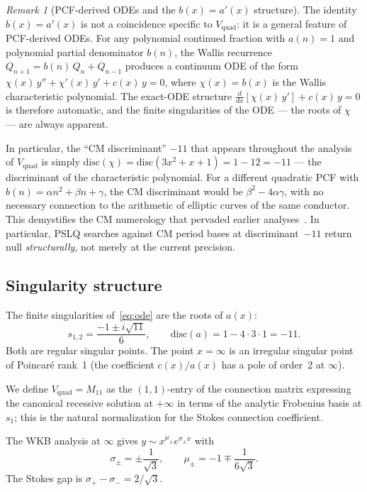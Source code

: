 \documentclass[11pt,a4paper]{article}
\theoremstyle{definition}
\theoremstyle{remark}
\newtheorem{remark}[theorem]{Remark}
\newcommand{\Vq}{V_{\mathrm{quad}}}
\begin{document}
\begin{remark}[PCF-derived ODEs and the
  $b(x)=a'(x)$ structure]
\label{rem:pcf-ode-general}
The identity $b(x) = a'(x)$ is not a
coincidence specific to $\Vq$: it is a
general feature of PCF-derived ODEs.
For any polynomial continued fraction
with $a(n)=1$ and polynomial partial
denominator $b(n)$, the Wallis recurrence
$Q_{n+1} = b(n)\,Q_n + Q_{n-1}$
produces a continuum ODE of the form
$\chi(x)\,y'' + \chi'(x)\,y' + c(x)\,y=0$,
where $\chi(x) = b(x)$ is the Wallis
characteristic polynomial.
The exact-ODE structure
$\frac{d}{dx}[\chi(x)\,y'] + c(x)\,y=0$
is therefore automatic, and the finite
singularities of the ODE --- the roots
of $\chi$ --- are always apparent.

In particular, the ``CM discriminant''
$-11$ that appears throughout the analysis
of $\Vq$ is simply
$\mathrm{disc}(\chi) = \mathrm{disc}(3x^2+x+1)
= 1 - 12 = -11$
--- the discriminant of the characteristic
polynomial. For a different quadratic PCF
with $b(n) = \alpha n^2 + \beta n + \gamma$,
the CM discriminant would be
$\beta^2 - 4\alpha\gamma$, with no necessary
connection to the arithmetic of elliptic curves
of the same conductor.
This demystifies the CM numerology that pervaded
earlier analyses~\cite{vquad-exclusion}.
In particular, PSLQ searches against CM period
bases at discriminant~$-11$ return null
\emph{structurally}, not merely at the current
precision.
\end{remark}

\subsection{Singularity structure}

The finite singularities of~\eqref{eq:ode}
are the roots of $a(x)$:
\begin{equation}\label{eq:sing}
  s_{1,2} = \frac{-1 \pm i\sqrt{11}}{6},
  \qquad \mathrm{disc}(a)
  = 1 - 4 \cdot 3 \cdot 1 = -11.
\end{equation}
Both are regular singular points. The point
$x=\infty$ is an irregular singular point of
Poincar\'e rank~1 (the coefficient $c(x)/a(x)$
has a pole of order~2 at $\infty$).

We define $\Vq = M_{11}$ as the
$(1,1)$-entry of the connection matrix
expressing the canonical recessive solution
at $+\infty$ in terms of the analytic
Frobenius basis at $s_1$; this is the
natural normalization for the Stokes
connection coefficient.

The WKB analysis at $\infty$ gives
$y \sim x^{\mu_\pm} e^{\sigma_\pm x}$ with
\begin{equation}\label{eq:wkb}
  \sigma_\pm = \pm \frac{1}{\sqrt{3}},
  \qquad
  \mu_\pm = -1 \mp \frac{1}{6\sqrt{3}}.
\end{equation}
The Stokes gap is
$\sigma_+ - \sigma_- = 2/\sqrt{3}$.
\end{document}
